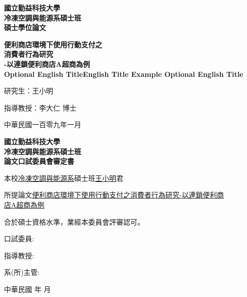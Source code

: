 \documentclass[12pt]{ncut}
\begin{document}
\begin{titlepage}
  \renewcommand{\baselinestretch}{1.2}
    \begin{center}
        \vspace{0cm}
        \Huge
        \textbf{國立勤益科技大學\\
        冷凍空調與能源系碩士班\\
        碩士學位論文}

        \vspace{2cm}
        \Huge
        \bfseries
        便利商店環境下使用行動支付之\\
        消費者行為研究\\
        -以連鎖便利商店A超商為例\\
        Optional English TitleEnglish Title Example
        Optional English Title

        \vspace{1.5cm}

        \Large
        研究生：王小明
        \vspace{1.5cm}

        指導教授：李大仁 博士

        \vfill

        中華民國一百零九年一月

    \end{center}
    \newpage
\end{titlepage}
\begin{titlepage}
    \begin{center} %
      \fontsize{22pt}{22pt}
      \textbf{國立勤益科技大學\\
        冷凍空調與能源系碩士班\\
        論文口試委員會審定書}\\
    \end{center}
    \vspace{1cm}
    \large
    \begin{center}
      本校\underline{冷凍空調與能源系}碩士班\underline{王小明}君
    \end{center}

    \noindent 所提論文\underline{便利商店環境下使用行動支付之消費者行為研究-以連鎖便利商}\\
    \underline{店A超商為例}

    \vspace{2cm}
    \noindent 合於碩士資格水準，業經本委員會評審認可。

    \vspace{1cm}
    \noindent 口試委員:
    \vfill

    \noindent 指導教授:

    \makebox[0pt]{}\newline %
    系(所)主管:

    \makebox[0pt]{}\newline %
    中華民國  年 月
    \newpage
\end{titlepage}
\end{document}
